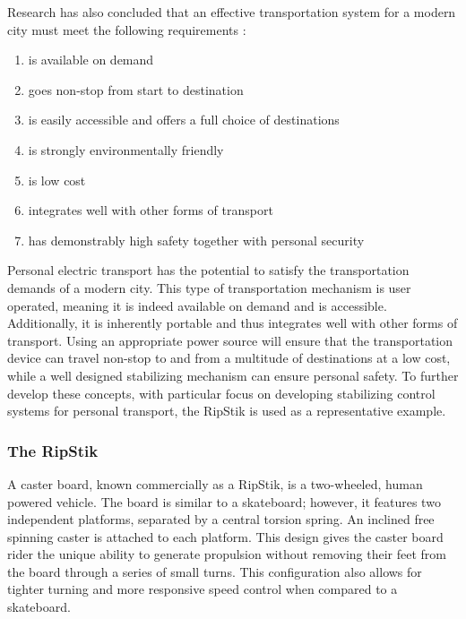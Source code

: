 Research has also concluded that an effective transportation system for a modern city must meet the following requirements \cite{SustainableTransport}:

\begin{enumerate}
	\item is available on demand
	\item goes non-stop from start to destination
	\item is easily accessible and offers a full choice of destinations
	\item is strongly environmentally friendly
	\item is low cost
	\item integrates well with other forms of transport
	\item has demonstrably high safety together with personal security
\end{enumerate}

Personal electric transport has the potential to satisfy the transportation demands of a modern city. 
This type of transportation mechanism is user operated, meaning it is indeed available on demand and is accessible. 
Additionally, it is inherently portable and thus integrates well with other forms of transport. 
Using an appropriate power source will ensure that the transportation device can travel non-stop to and from a multitude of destinations at a low cost, while a well designed stabilizing mechanism can ensure personal safety. 
To further develop these concepts, with particular focus on developing stabilizing control systems for personal transport, the RipStik is used as a representative example.

\subsubsection{The RipStik}

A caster board, known commercially as a RipStik, is a two-wheeled, human powered vehicle. 
The board is similar to a skateboard; however, it features two independent platforms, separated by a central torsion spring.
An inclined free spinning caster is attached to each platform. 
This design gives the caster board rider the unique ability to generate propulsion without removing their feet from the board through a series of small turns. 
This configuration also allows for tighter turning and more responsive speed control when compared to a skateboard. 

